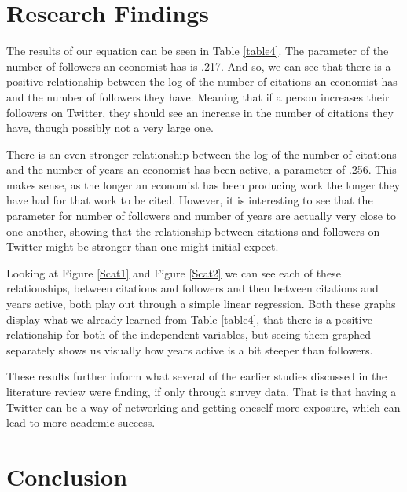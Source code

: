 \documentclass[12pt, Times New Roman]{article}
\begin{document}
\section*{Research Findings}\label{sec:results}

The results of our equation can be seen in Table \ref{table4}. The parameter of the number of followers an economist has is .217. And so, we can see that there is a positive relationship between the log of the number of citations an economist has and the number of followers they have. Meaning that if a person increases their followers on Twitter, they should see an increase in the number of citations they have, though possibly not a very large one. 

There is an even stronger relationship between the log of the number of citations and the number of years an economist has been active, a parameter of .256. This makes sense, as the longer an economist has been producing work the longer they have had for that work to be cited. However, it is interesting to see that the parameter for number of followers and number of years are actually very close to one another, showing that the relationship between citations and followers on Twitter might be stronger than one might initial expect. 

Looking at Figure \ref{Scat1} and Figure \ref{Scat2} we can see each of these relationships, between citations and followers and then between citations and years active, both play out through a simple linear regression. Both these graphs display what we already learned from Table \ref{table4}, that there is a positive relationship for both of the independent variables, but seeing them graphed separately shows us visually how years active is a bit steeper than followers.

These results further inform what several of the earlier studies discussed in the literature review were finding, if only through survey data. That is that having a Twitter can be a way of networking and getting oneself more exposure, which can lead to more academic success. 

\section*{Conclusion}\label{sec:conclusion}
\end{document}
